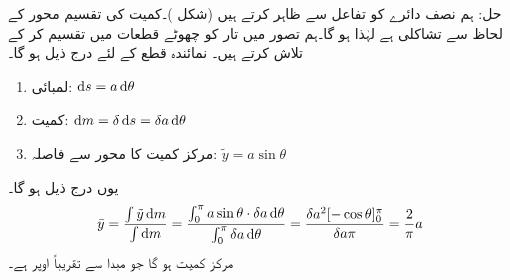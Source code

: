 حل:\quad
ہم نصف دائرے کو تفاعل  سے ظاہر کرتے ہیں (شکل )۔کمیت کی تقسیم محور  کے لحاظ سے تشاکلی ہے لہٰذا   ہو گا۔ہم تصور میں تار کو چھوٹے قطعات میں تقسیم کر کے  تلاش کرتے ہیں۔ نمائندہ قطع کے لئے درج ذیل ہو گا۔
\begin{multicols}{2}
\begin{enumerate}[]
\item
لمبائی:\quad
$\dif s=a\dif \theta$
\item
کمیت:\quad
$\dif m=\delta \dif s=\delta a\dif \theta$
\item
مرکز کمیت کا محور  سے فاصلہ:\quad
$\tilde{y}=a\sin\theta$ 
\end{enumerate}
\end{multicols}
یوں درج ذیل ہو گا۔
\begin{align*}
\bar{y}=\frac{\int\tilde{y}\dif m}{\int\dif m}=\frac{\int_0^{\pi}a\sin\theta\cdot\delta a\dif \theta}{\int_0^{\pi}\delta a\dif \theta}=\frac{\delta a^2[-\cos\theta]_0^{\pi}}{\delta a\pi}=\frac{2}{\pi}a
\end{align*}
مرکز کمیت  ہو گا جو مبدا سے تقریباً  اوپر ہے۔
